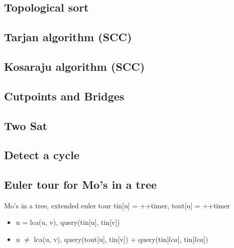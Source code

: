 
\subsection{Topological sort }

\subsection{Tarjan algorithm (SCC) }

\subsection{Kosaraju algorithm (SCC) }

\subsection{Cutpoints and Bridges }


\subsection{Two Sat }

\subsection{Detect a cycle }

\subsection{Euler tour for Mo's in a tree }
\vspace{-5pt}
Mo's in a tree, extended euler tour \small{tin[u] = ++timer, tout[u] = ++timer} 
\vspace{-5pt}
\begin{itemize}[noitemsep]
  \item u = lca(u, v), query(tin[u], tin[v]) 
  \item u $\neq$ lca(u, v), query(tout[u], tin[v]) + query(tin[$lca$], tin[$lca$])
\end{itemize}
\vspace{-10pt}

